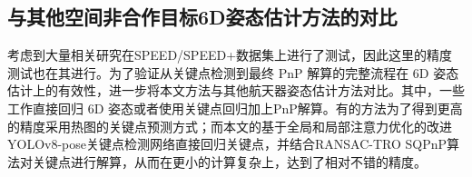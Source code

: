 \begin{table}[!htbp]
	\centering
	\caption{在SPEED+合成数据集上的PnP算法对比}
	\label{tab:PnPCmp}
\end{table}



\subsection{与其他空间非合作目标6D姿态估计方法的对比}
\label{sec:RANSAC-TRO-SQPnP:OthersCompare}
考虑到大量相关研究在SPEED/SPEED+数据集上进行了测试，因此这里的精度测试也在其进行。为了验证从关键点检测到最终 PnP 解算的完整流程在 6D 姿态估计上的有效性，进一步将本文方法与其他航天器姿态估计方法对比。其中，一些工作直接回归 6D 姿态或者使用关键点回归加上PnP解算。有的方法为了得到更高的精度采用热图的关键点预测方式；而本文的基于全局和局部注意力优化的改进YOLOv8-pose关键点检测网络直接回归关键点，并结合RANSAC-TRO SQPnP算法对关键点进行解算，从而在更小的计算复杂上，达到了相对不错的精度。


